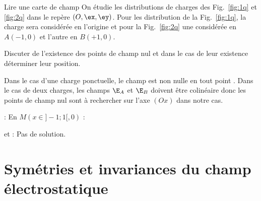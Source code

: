 \documentclass[12pt,fancy]{/Users/victor/Documents/COURS/2ACapECL/texmf/tex/latex/Preambles/cours}
\begin{document}
\begin{exemple}{Lire une carte de champ}
On étudie les distributions de charges des Fig.~\ref{fig:1q} et \ref{fig:2q} dans le repère $(O,\ex,\ey)$. Pour les distribution de la Fig.~\ref{fig:1q}, la charge sera considérée en l'origine et pour la Fig.~\ref{fig:2q} une considérée en $A(-1,0)$ et l'autre en $B(+1,0)$.

\noindent Discuter de l'existence des points de champ nul et dans le cas de leur existence déterminer leur position.

\begin{solu}
\noindent Dans le cas d'une charge ponctuelle, le champ est non nulle en tout point .
Dans le cas de deux charges, les champs $\E_{A}$ et $\E_{B}$ doivent être colinéaire donc les points de champ nul sont à rechercher sur l'axe $(Ox)$ dans notre cas.
\begin{liste}
\item {} : En $M(x\in]-1;1[,0)$ : 
\item {} et  : Pas de solution.
\end{liste}
\end{solu}

\end{exemple}

\FloatBarrier

\section{Symétries et invariances du champ électrostatique}
\label{sec:topographie_symétrie_invariances}
\end{document}
